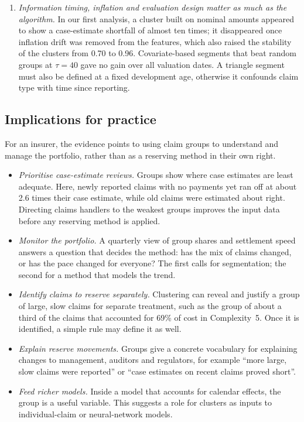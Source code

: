 \begin{enumerate}[leftmargin=*]
\begin{itemize}[leftmargin=*]
  \item \emph{Monitoring.} Tracking the groups over time distinguishes a change in mix from a change in development speed within the groups. It raised no false alarm in the scenario without change.
  \end{itemize}
\item \emph{Information timing, inflation and evaluation design matter as much as the algorithm.} In our first analysis, a cluster built on nominal amounts appeared to show a case-estimate shortfall of almost ten times; it disappeared once inflation drift was removed from the features, which also raised the stability of the clusters from 0.70 to 0.96. Covariate-based segments that beat random groups at $\tau=40$ gave no gain over all valuation dates. A triangle segment must also be defined at a fixed development age, otherwise it confounds claim type with time since reporting.
\end{enumerate}

\subsection{Implications for practice}

For an insurer, the evidence points to using claim groups to understand and manage the portfolio, rather than as a reserving method in their own right.

\begin{itemize}[leftmargin=*]
\item \emph{Prioritise case-estimate reviews.} Groups show where case estimates are least adequate. Here, newly reported claims with no payments yet ran off at about 2.6 times their case estimate, while old claims were estimated about right. Directing claims handlers to the weakest groups improves the input data before any reserving method is applied.
\item \emph{Monitor the portfolio.} A quarterly view of group shares and settlement speed answers a question that decides the method: has the mix of claims changed, or has the pace changed for everyone? The first calls for segmentation; the second for a method that models the trend.
\item \emph{Identify claims to reserve separately.} Clustering can reveal and justify a group of large, slow claims for separate treatment, such as the group of about a third of the claims that accounted for 69\% of cost in Complexity~5. Once it is identified, a simple rule may define it as well.
\item \emph{Explain reserve movements.} Groups give a concrete vocabulary for explaining changes to management, auditors and regulators, for example ``more large, slow claims were reported'' or ``case estimates on recent claims proved short''.
\item \emph{Feed richer models.} Inside a model that accounts for calendar effects, the group is a useful variable. This suggests a role for clusters as inputs to individual-claim or neural-network models.
\end{itemize}


